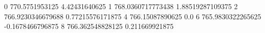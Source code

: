 0 770.5751953125 4.42431640625
1 768.0360717773438 1.88519287109375
2 766.9230346679688 0.77215576171875
4 766.15087890625 0.0
6 765.9830322265625 -0.1678466796875
8 766.362548828125 0.211669921875
